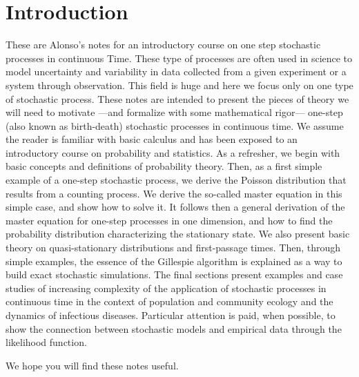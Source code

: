 \section{Introduction}
These are Alonso's notes for an introductory course on one step stochastic processes in continuous Time. These type of processes are often used in science to model uncertainty and variability in data collected from a given experiment or a system through observation. This field is huge and here we focus only on one type of stochastic process. These notes are intended to present the pieces of theory we will need to motivate ---and formalize with some mathematical rigor--- one-step (also known as birth-death) stochastic processes in continuous time. We assume the reader is familiar with basic calculus and has been exposed to an introductory course on probability and statistics. As a refresher, we begin with basic concepts and definitions of probability theory. Then, as a first simple example of a one-step stochastic process, we derive the Poisson distribution that results from a counting process. We derive the so-called master equation in this simple case, and show how to solve it. It follows then a general derivation of the master equation for one-step processes in one dimension, and how to find the probability distribution characterizing the stationary state. We also present basic theory on quasi-stationary distributions and first-passage times. Then, through simple examples, the essence of the Gillespie algorithm is explained as a way to build exact stochastic simulations. The final sections present examples and case studies of increasing complexity of the application of stochastic processes in continuous time in the context of population and community ecology and the dynamics of infectious diseases. Particular attention is paid, when possible, to show the connection between stochastic models and empirical data through the likelihood function.
\smallskip

We hope you will find these notes useful. 

